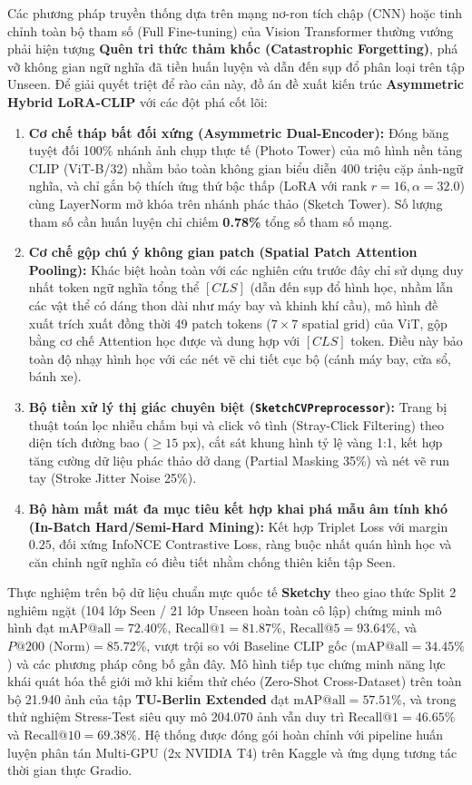 \documentclass[12pt,a4paper]{report}
\begin{document}
Các phương pháp truyền thống dựa trên mạng nơ-ron tích chập (CNN) hoặc tinh chỉnh toàn bộ tham số (Full Fine-tuning) của Vision Transformer thường vướng phải hiện tượng \textbf{Quên tri thức thảm khốc (Catastrophic Forgetting)}, phá vỡ không gian ngữ nghĩa đã tiền huấn luyện và dẫn đến sụp đổ phân loại trên tập Unseen. Để giải quyết triệt để rào cản này, đồ án đề xuất kiến trúc \textbf{Asymmetric Hybrid LoRA-CLIP} với các đột phá cốt lõi:
\begin{enumerate}[leftmargin=*]
    \item \textbf{Cơ chế tháp bất đối xứng (Asymmetric Dual-Encoder):} Đóng băng tuyệt đối 100\% nhánh ảnh chụp thực tế (Photo Tower) của mô hình nền tảng CLIP (ViT-B/32) nhằm bảo toàn không gian biểu diễn 400 triệu cặp ảnh-ngữ nghĩa, và chỉ gắn bộ thích ứng thứ bậc thấp (LoRA với rank $r=16, \alpha=32.0$) cùng LayerNorm mở khóa trên nhánh phác thảo (Sketch Tower). Số lượng tham số cần huấn luyện chỉ chiếm \textbf{0.78\%} tổng số tham số mạng.
    \item \textbf{Cơ chế gộp chú ý không gian patch (Spatial Patch Attention Pooling):} Khác biệt hoàn toàn với các nghiên cứu trước đây chỉ sử dụng duy nhất token ngữ nghĩa tổng thể $[CLS]$ (dẫn đến sụp đổ hình học, nhầm lẫn các vật thể có dáng thon dài như máy bay và khinh khí cầu), mô hình đề xuất trích xuất đồng thời 49 patch tokens ($7 \times 7$ spatial grid) của ViT, gộp bằng cơ chế Attention học được và dung hợp với $[CLS]$ token. Điều này bảo toàn độ nhạy hình học với các nét vẽ chi tiết cục bộ (cánh máy bay, cửa sổ, bánh xe).
    \item \textbf{Bộ tiền xử lý thị giác chuyên biệt (\texttt{SketchCVPreprocessor}):} Trang bị thuật toán lọc nhiễu chấm bụi và click vô tình (Stray-Click Filtering) theo diện tích đường bao ($\ge 15\text{ px}$), cắt sát khung hình tỷ lệ vàng 1:1, kết hợp tăng cường dữ liệu phác thảo dở dang (Partial Masking 35\%) và nét vẽ run tay (Stroke Jitter Noise 25\%).
    \item \textbf{Bộ hàm mất mát đa mục tiêu kết hợp khai phá mẫu âm tính khó (In-Batch Hard/Semi-Hard Mining):} Kết hợp Triplet Loss với margin $0.25$, đối xứng InfoNCE Contrastive Loss, ràng buộc nhất quán hình học và căn chỉnh ngữ nghĩa có điều tiết nhằm chống thiên kiến tập Seen.
\end{enumerate}

Thực nghiệm trên bộ dữ liệu chuẩn mực quốc tế \textbf{Sketchy} theo giao thức Split 2 nghiêm ngặt (104 lớp Seen / 21 lớp Unseen hoàn toàn cô lập) chứng minh mô hình đạt $\text{mAP@all} = \mathbf{72.40\%}$, $\text{Recall@1} = \mathbf{81.87\%}$, $\text{Recall@5} = \mathbf{93.64\%}$, và $P@200\text{ (Norm)} = \mathbf{85.72\%}$, vượt trội so với Baseline CLIP gốc ($\text{mAP@all} = 34.45\%$) và các phương pháp công bố gần đây. Mô hình tiếp tục chứng minh năng lực khái quát hóa thế giới mở khi kiểm thử chéo (Zero-Shot Cross-Dataset) trên toàn bộ 21.940 ảnh của tập \textbf{TU-Berlin Extended} đạt $\text{mAP@all} = \mathbf{57.51\%}$, và trong thử nghiệm Stress-Test siêu quy mô 204.070 ảnh vẫn duy trì $\text{Recall@1} = \mathbf{46.65\%}$ và $\text{Recall@10} = \mathbf{69.38\%}$. Hệ thống được đóng gói hoàn chỉnh với pipeline huấn luyện phân tán Multi-GPU (2x NVIDIA T4) trên Kaggle và ứng dụng tương tác thời gian thực Gradio.
\end{document}
